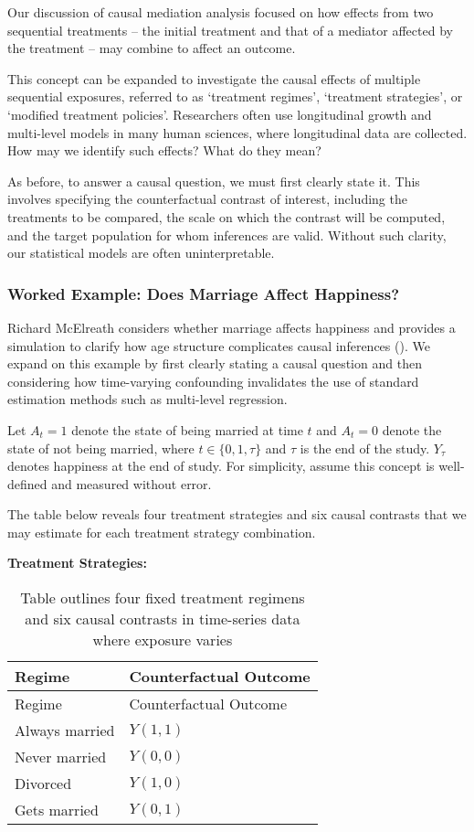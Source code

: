 \documentclass[
  single column]{article}
\begin{document}
Our discussion of causal mediation analysis focused on how effects from
two sequential treatments -- the initial treatment and that of a
mediator affected by the treatment -- may combine to affect an outcome.

This concept can be expanded to investigate the causal effects of
multiple sequential exposures, referred to as `treatment regimes',
`treatment strategies', or `modified treatment policies'. Researchers
often use longitudinal growth and multi-level models in many human
sciences, where longitudinal data are collected. How may we identify
such effects? What do they mean?

As before, to answer a causal question, we must first clearly state it.
This involves specifying the counterfactual contrast of interest,
including the treatments to be compared, the scale on which the contrast
will be computed, and the target population for whom inferences are
valid. Without such clarity, our statistical models are often
uninterpretable.

\subsubsection{Worked Example: Does Marriage Affect
Happiness?}\label{worked-example-does-marriage-affect-happiness}

Richard McElreath considers whether marriage affects happiness and
provides a simulation to clarify how age structure complicates causal
inferences (). We expand on this example by first clearly stating a causal
question and then considering how time-varying confounding invalidates
the use of standard estimation methods such as multi-level regression.

Let \(A_t = 1\) denote the state of being married at time \(t\) and
\(A_t = 0\) denote the state of not being married, where
\(t \in \{0, 1, \tau\}\) and \(\tau\) is the end of the study.
\(Y_\tau\) denotes happiness at the end of study. For simplicity, assume
this concept is well-defined and measured without error.

The table below reveals four treatment strategies and six causal
contrasts that we may estimate for each treatment strategy combination.

\textbf{Treatment Strategies:}

\begin{longtable}[]{@{}ll@{}}
\caption{Table outlines four fixed treatment regimens and six causal
contrasts in time-series data where exposure
varies}\label{tbl-regimens-marriage}\tabularnewline
\toprule\noalign{}
Regime & Counterfactual Outcome \\
\midrule\noalign{}
\endfirsthead
\toprule\noalign{}
Regime & Counterfactual Outcome \\
\midrule\noalign{}
\endhead
\bottomrule\noalign{}
\endlastfoot
Always married & \(Y(1,1)\) \\
Never married & \(Y(0,0)\) \\
Divorced & \(Y(1,0)\) \\
Gets married & \(Y(0,1)\) \\
\end{longtable}
\end{document}
